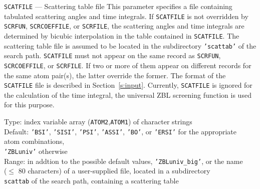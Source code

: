 \begin{keydescription}{\texttt{SCATFILE} --- Scattering table file}
%
  This parameter specifies a file containing tabulated scattering angles
  and time integrals. If \texttt{SCATFILE} is not overridden by \texttt{SCRFUN},
  \texttt{SCRCOEFFILE}, or \texttt{SCRFILE}, the scattering angles and time 
  integrals are determined 
  by bicubic interpolation in the table contained in \texttt{SCATFILE}. The 
  scattering table file is assumed to be located in the subdirectory 
  \texttt{'scattab'} of the search path. \texttt{SCATFILE} must not appear on
  the same record as \texttt{SCRFUN}, \texttt{SCRCOEFFILE}, or \texttt{SCRFILE}. 
  If two or more of them appear on different records for the same atom pair(s), 
  the latter override the former. The format of the \texttt{SCATFILE} file is 
  described in Section~\ref{s:input}. Currently, 
  \texttt{SCATFILE} is ignored for the calculation of the time integral, the 
  universal ZBL screening function is used for this purpose.
  \begin{keytab}
    Type:    \> index variable array (\texttt{ATOM2},\texttt{ATOM1}) 
                of character strings \\ 
    Default: \> \texttt{'BSI'}, \texttt{'SISI'}, \texttt{'PSI'}, 
                \texttt{'ASSI'}, \texttt{'BO'}, or \texttt{'ERSI'} for the 
                appropriate \\
             \> atom combinations, \\
             \> \texttt{'ZBLuniv'} otherwise \\
    Range:   \> in addtion to the possible default values, 
                \texttt{'ZBLuniv\_big'}, or the name \\
             \> ($\le$ 80 characters) of a user-supplied file, located in 
                a subdirectory \\
             \> \texttt{scattab} of the search path, containing a scattering 
                 table 
  \end{keytab}
\end{keydescription}

